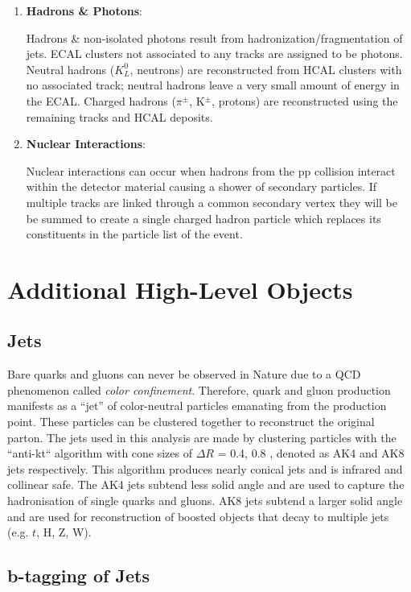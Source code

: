 \begin{enumerate}
\item \textbf{Hadrons \& Photons}:

Hadrons \& non-isolated photons result from hadronization/fragmentation of jets. ECAL clusters not associated to any tracks are assigned to be photons. Neutral hadrons ($K^{0}_{L}$, neutrons) are reconstructed from HCAL clusters with no associated track; neutral hadrons leave a very small amount of energy in the ECAL. Charged hadrons ($\pi^{\pm}$, K$^{\pm}$, protons) are reconstructed using the remaining tracks and HCAL deposits.

\item \textbf{Nuclear Interactions}:

Nuclear interactions can occur when hadrons from the pp collision interact within the detector material causing a shower of secondary particles. If multiple tracks are linked through a common secondary vertex they will be be summed to create a single charged hadron particle which replaces its constituents in the particle list of the event.

\end{enumerate}

\section{Additional High-Level Objects}

\subsection{Jets}

Bare quarks and gluons can never be observed in Nature due to a QCD phenomenon called \textit{color confinement}. Therefore, quark and gluon production manifests as a ``jet'' of color-neutral particles emanating from the production point. These particles can be clustered together to reconstruct the original parton. The jets used in this analysis are made by clustering particles with the ``anti-kt`` algorithm with cone sizes of $\Delta R$ = 0.4, 0.8 \cite{1126-6708-2008-04-063}, denoted as AK4 and AK8 jets respectively. This algorithm produces nearly conical jets and is infrared and collinear safe. The AK4 jets subtend less solid angle and are used to capture the hadronisation of single quarks and gluons. AK8 jets subtend a larger solid angle and are used for reconstruction of boosted objects that decay to multiple jets (e.g. $t$, H, Z, W).

\subsection{b-tagging of Jets}

